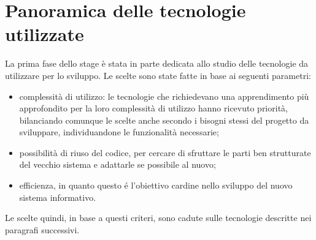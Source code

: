 \section{Panoramica delle tecnologie utilizzate}
La prima fase dello stage \`e stata in parte dedicata allo studio delle tecnologie da utilizzare per lo sviluppo. Le scelte sono state fatte in base ai seguenti parametri:
\begin{itemize}
  \item complessit\`a di utilizzo: le tecnologie che richiedevano una apprendimento pi\`u approfondito per la loro 
  complessit\`a di utilizzo hanno ricevuto priorit\`a, bilanciando comunque le scelte anche secondo i bisogni stessi del
progetto da sviluppare, individuandone le funzionalit\`a necessarie;
  \item possibilit\`a di riuso del codice, per cercare di sfruttare le parti ben strutturate del vecchio sistema e adattarle se possibile al nuovo;
  \item efficienza, in quanto questo \'e l'obiettivo cardine nello sviluppo del nuovo sistema informativo.
\end{itemize}
\noindent
Le scelte quindi, in base a questi criteri, sono cadute sulle tecnologie descritte nei paragrafi successivi.


